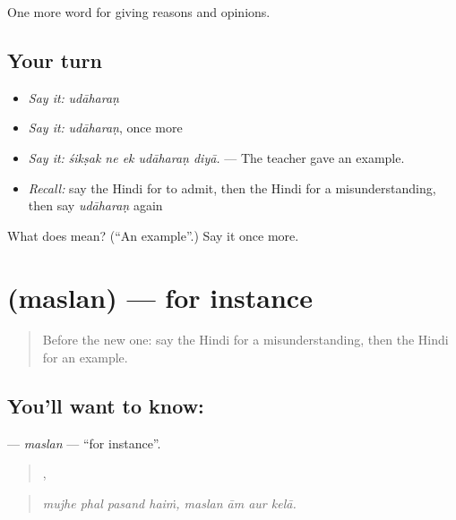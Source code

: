 \begin{grammarlens}[title={What you've built}]
One more word for giving reasons and opinions.
\end{grammarlens}

\subsection*{Your turn}
\begin{itemize}
\raggedright
  \item \emph{Say it:} \emph{udāharaṇ}
  \item \emph{Say it:} \emph{udāharaṇ}, once more
  \item \emph{Say it:} \emph{śikṣak ne ek udāharaṇ diyā.} — The teacher gave an example.
  \item \emph{Recall:} say the Hindi for to admit, then the Hindi for a misunderstanding, then say \emph{udāharaṇ} again
\end{itemize}

\begin{tcolorbox}[breakable,colback=teal!4,colframe=teal!35!black,title={Before you move on}]
What does  mean? (\textquotedblleft{}An example\textquotedblright{}.) Say it once more.
\end{tcolorbox}
\section[\texorpdfstring{\hi{मसलन} (maslan)}{मसलन (maslan)}]{ (maslan) — for instance}

\label{lesson:HI-C350-maslan}



\begin{quote}
Before the new one: say the Hindi for a misunderstanding, then the Hindi for an example.
\end{quote}

\subsection*{You'll want to know: }
\textbf{} — \emph{maslan} — \textquotedblleft{}for instance\textquotedblright{}.

\begin{quote}
   ,    
\end{quote}

\begin{quote}
\emph{mujhe phal pasand haiṁ, maslan ām aur kelā.}
\end{quote}

